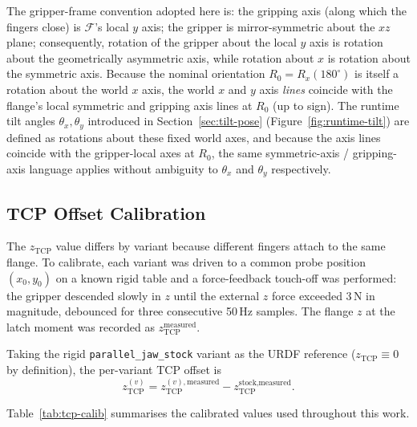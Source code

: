 The gripper-frame convention adopted here is: the gripping axis (along which
the fingers close) is $\mathcal{F}$'s local $y$ axis; the gripper is
mirror-symmetric about the $xz$ plane; consequently, rotation of the gripper
about the local $y$ axis is rotation about the geometrically asymmetric
axis, while rotation about $x$ is rotation about the symmetric axis.
Because the nominal orientation $R_0 = R_x(180^{\circ})$ is itself a
rotation about the world $x$ axis, the world $x$ and $y$ axis \emph{lines}
coincide with the flange's local symmetric and gripping axis lines at
$R_0$ (up to sign). The runtime tilt angles $\theta_x, \theta_y$
introduced in Section~\ref{sec:tilt-pose} (Figure~\ref{fig:runtime-tilt})
are defined as rotations about
these fixed world axes, and because the axis lines coincide with the
gripper-local axes at $R_0$, the same symmetric-axis / gripping-axis
language applies without ambiguity to $\theta_x$ and $\theta_y$
respectively.

\subsection{TCP Offset Calibration}
\label{sec:tcp-calib}

The $z_{\text{TCP}}$ value differs by variant because different fingers
attach to the same flange. To calibrate, each variant was driven to a
common probe position $(x_0, y_0)$ on a known rigid table and a force-feedback
touch-off was performed: the gripper descended slowly in $z$ until the
external $z$ force exceeded $3$\,N in magnitude, debounced for three
consecutive 50\,Hz samples. The flange $z$ at the latch moment was
recorded as $z_{\text{TCP}}^{\text{measured}}$.

Taking the rigid \texttt{parallel\_jaw\_stock} variant as the URDF reference
($z_{\text{TCP}} \equiv 0$ by definition), the per-variant TCP offset is
\begin{equation}
  z_{\text{TCP}}^{(v)} = z_{\text{TCP}}^{(v),\text{measured}}
                       - z_{\text{TCP}}^{\text{stock},\text{measured}}.
  \label{eq:tcp-calib}
\end{equation}

Table~\ref{tab:tcp-calib} summarises the calibrated values used throughout
this work.

